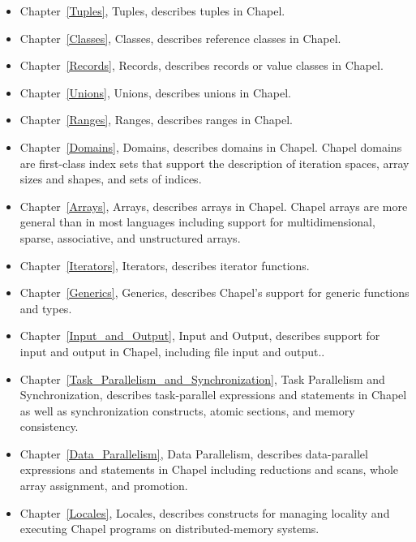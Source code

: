 \begin{itemize}
\item
Chapter~\ref{Tuples}, Tuples, describes tuples in Chapel.

\item
Chapter~\ref{Classes}, Classes, describes reference classes in Chapel.

\item
Chapter~\ref{Records}, Records, describes records or value classes in
Chapel.

\item
Chapter~\ref{Unions}, Unions, describes unions in Chapel.

\item
Chapter~\ref{Ranges}, Ranges, describes ranges in Chapel.

\item
Chapter~\ref{Domains}, Domains, describes domains in Chapel.  Chapel
domains are first-class index sets that support the description of
iteration spaces, array sizes and shapes, and sets of indices.

\item
Chapter~\ref{Arrays}, Arrays, describes arrays in Chapel.  Chapel arrays are
more general than in most languages including support for
multidimensional, sparse, associative, and unstructured arrays.

\item
Chapter~\ref{Iterators}, Iterators, describes iterator functions.

\item
Chapter~\ref{Generics}, Generics, describes Chapel's support for
generic functions and types.

\item
Chapter~\ref{Input_and_Output}, Input and Output, describes support
for input and output in Chapel, including file input and output..

\item
Chapter~\ref{Task_Parallelism_and_Synchronization}, Task Parallelism
and Synchronization, describes task-parallel expressions and
statements in Chapel as well as synchronization constructs, atomic
sections, and memory consistency.

\item
Chapter~\ref{Data_Parallelism}, Data Parallelism, describes
data-parallel expressions and statements in Chapel including
reductions and scans, whole array assignment, and promotion.

\item
Chapter~\ref{Locales}, Locales, describes constructs for managing
locality and executing Chapel programs on distributed-memory systems.


\end{itemize}
